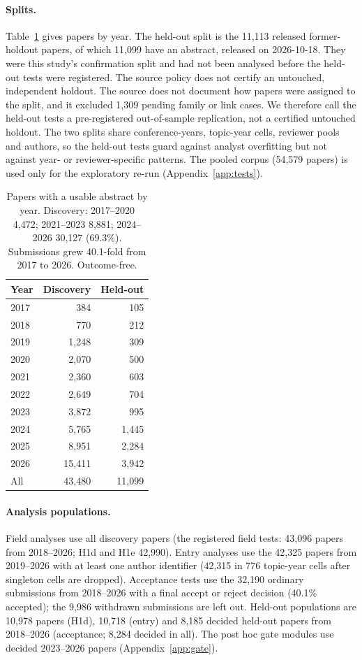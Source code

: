 \paragraph{Splits.} Table~\ref{tab:app-years} gives papers by year. The held-out split is the 11,113 released
former-holdout papers, of which 11,099 have an abstract, released on 2026-10-18. They were this study's confirmation
split and had not been analysed before the held-out tests were registered. The source policy does not certify an
untouched, independent holdout. The source does not document how papers were assigned to the split, and it excluded
1,309 pending family or link cases. We therefore call the held-out tests a pre-registered out-of-sample replication, not a certified untouched
holdout. The two splits share conference-years, topic-year cells, reviewer pools and authors, so the held-out tests
guard against analyst overfitting but not against year- or reviewer-specific patterns. The pooled corpus (54,579
papers) is used only for the exploratory re-run (Appendix~\ref{app:tests}).

\begin{table}[t]
\centering\footnotesize
\begin{tabular}{@{}lrr@{}}
\toprule
Year & Discovery & Held-out \\
\midrule
2017 & 384 & 105 \\
2018 & 770 & 212 \\
2019 & 1,248 & 309 \\
2020 & 2,070 & 500 \\
2021 & 2,360 & 603 \\
2022 & 2,649 & 704 \\
2023 & 3,872 & 995 \\
2024 & 5,765 & 1,445 \\
2025 & 8,951 & 2,284 \\
2026 & 15,411 & 3,942 \\
\midrule
All & 43,480 & 11,099 \\
\bottomrule
\end{tabular}
\caption{Papers with a usable abstract by year. Discovery: 2017--2020 4,472; 2021--2023 8,881; 2024--2026 30,127
(69.3\%). Submissions grew 40.1-fold from 2017 to 2026. Outcome-free.}
\label{tab:app-years}
\end{table}

\paragraph{Analysis populations.} Field analyses use all discovery papers (the registered field tests: 43,096 papers
from 2018--2026; H1d and H1e 42,990). Entry analyses use the 42,325 papers from 2019--2026 with at least one author
identifier (42,315 in 776 topic-year cells after singleton cells are dropped). Acceptance tests use the 32,190
ordinary submissions from 2018--2026 with a final accept or reject decision (40.1\% accepted); the 9,986 withdrawn
submissions are left out. Held-out populations are 10,978 papers (H1d), 10,718 (entry) and 8,185 decided held-out
papers from 2018--2026 (acceptance; 8,284 decided in all). The post hoc gate modules use decided 2023--2026 papers
(Appendix~\ref{app:gate}).

